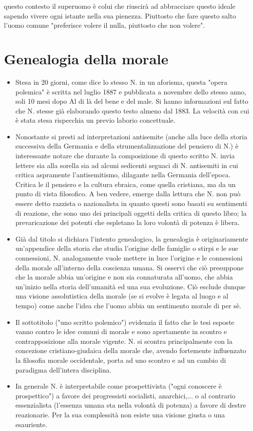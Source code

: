 \documentclass[10pt,a4paper]{article}
\begin{document}
questo contesto il superuomo è colui che riuscirà ad abbracciare questo ideale sapendo vivere ogni istante nella sua pienezza. Piuttosto che fare questo salto l'uomo comune "preferisce volere il nulla, piuttosto che non volere". 

\newpage
\section{Genealogia della morale}
\begin{itemize}
	\item Stesa in 20 giorni, come dice lo stesso N. in un aforisma, questa "opera polemica" è scritta nel luglio 1887 e pubblicata a novembre dello stesso anno, soli 10 mesi dopo Al di là del bene e del male. Si hanno informazioni sul fatto che N. stesse già elaborando questo testo almeno dal 1883. La velocità con cui è stata stesa rispecchia un previo laborio concettuale. 
	\item Nonostante si presti ad interpretazioni antisemite (anche alla luce della storia successiva della Germania e della strumentalizzazione del pensiero di N.) è interessante notare che durante la composizione di questo scritto N. invia lettere sia alla sorella sia ad alcuni sedicenti seguaci di N. antisemiti in cui critica aspramente l'antisemitismo, dilagante nella Germania dell'epoca. Critica le il pensiero e la cultura ebraica, come quella cristiana, ma da un punto di vista filosofico. A ben vedere, emerge dalla lettura che N. non può essere detto razzista o nazionalista in quanto questi sono basati su sentimenti di reazione, che sono uno dei principali oggetti della critica di questo libro; la prevaricazione dei potenti che espletano la loro volontà di potenza è libera.
	\item Già dal titolo si dichiara l'intento genealogico, la genealogia è originariamente un'appendice della storia che studia l'origine delle famiglie o stirpi e le sue connessioni, N. analogamente vuole mettere in luce l'origine e le connessioni della morale all'interno della coscienza umana. Si osservi che ciò presuppone che la morale abbia un'origine e non sia connaturata all'uomo, che abbia un'inizio nella storia dell'umanità ed una sua evoluzione. Ciò esclude dunque una visione assolutistica della morale (se si evolve è legata al luogo e al tempo) come anche l'idea che l'uomo abbia un sentimento morale di per sè. 
	\item Il sottotitolo ("uno scritto polemico") evidenzia il fatto che le tesi esposte vanno contro le idee comuni di morale e sono apertamente in scontro e contrapposizione alla morale vigente. N. si scontra principalmente con la concezione cristiano-giudaica della morale che, avendo fortemente influenzato la filosofia morale occidentale, porta ad uno scontro e ad un cambio di paradigma dell'intera disciplina. 
	\item In generale N. è interpretabile come prospettivista ("ogni conoscere è prospettico") a favore dei progressisti socialisti, anarchici,... o al contrario essenzialista (l'essenza umana sta nella volontà di potenza) a favore di destre reazionarie. Per la sua complessità non esiste una visione giusta o una esauriente.
\end{itemize}
\end{document}
